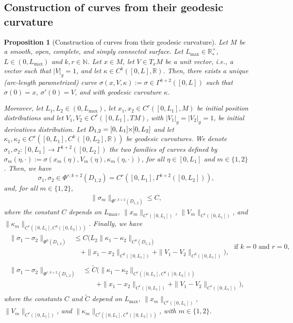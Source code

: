 \documentclass{article}
\newcommand{\Lmax}{L_{\max}}
\newcommand{\PLH}{{\mkern-1mu\times\mkern-1mu}}
\newcommand{\Times}{\PLH}
\newcommand{\R}{\mathbb{R}}
\newcommand{\surf}{M}
\newcommand{\EN}{\mathbb{N}}
\newcommand{\ko}{\kappa}
\newtheorem{proposition}[theorem]{Proposition}
\theoremstyle{remark}
\theoremstyle{prpart}
\begin{document}
\subsection{Construction of curves from their geodesic curvature}\label{subsec:construction}
\begin{proposition}[Construction of curves from their geodesic curvature]\label{prop:constr-courbe}
 Let $\surf$ be a smooth, open, complete, and simply connected surface. Let $\Lmax\in\R^+_\ast$, $L\in(0,\Lmax)$ and $k,r\in\EN$. Let $x\in \surf$, let $V\in T_x\surf$ be a unit vector, i.e., a vector such that $|V|_g=1$, and let $\ko\in C^k([0,L],\R)$. Then, there exists a unique (arc-length parametrized) curve $\sigma(x,V,\ko):=\sigma\in \Gamma^{k+2}([0,L])$ such that $\sigma(0) = x$, $\sigma'(0) = V$, and with geodesic curvature $\ko$.

  Moreover, let $L_1,L_2\in(0,\Lmax)$, let $x_1,x_2\in C^r([0,L_1],\surf)$ be initial position distributions and let $V_1,V_2\in C^r([0,L_1],T\surf)$, with $|V_1|_g=|V_2|_g=1$, be initial derivatives distribution. Let $D_{1,2}=[0,L_1]\Times[0,L_2]$ and let $\ko_1, \ko_2 \in C^r([0,L_1],C^k([0,L_2],\R))$ be geodesic curvatures. We denote $\sigma_1,\sigma_2:[0,L_1]\to \Gamma^{k+2}([0,L_2])$ the two families of curves defined by $\sigma_m(\eta,\cdot):=\sigma(x_m(\eta),V_m(\eta),\ko_m(\eta,\cdot))$, for all $\eta\in[0,L_1]$ and $m\in\{1,2\}$. Then, we have
\begin{equation*}
\sigma_1,\sigma_2\in \Phi^{r,k+2}(D_{1,2})=C^r([0,L_1],\Gamma^{k+2}([0,L_2])),
\end{equation*}
and, for all $m\in\{1,2\}$, 
\begin{equation}\label{eq:borne-courbe}
\begin{split}
\|\sigma_m\|_{\Phi^{r,k+2}(D_{1,2})} \leq C,
\end{split}
\end{equation}
where the constant $C$ depends on $\Lmax$, $\|x_m\|_{C^r([0,L_1])}$, $\|V_m\|_{C^r([0,L_1])}$, and $\|\ko_m\|_{C^r([0,L_1],C^k([0,L_2]))}$.
Finally, we have%
\begin{subequations}  \label{eq:estim-courbe}
\begin{align}\label{eq:estim-courbe1}
\begin{split}
  \|\sigma_1-\sigma_2\|_{\Phi^{0}(D_{1,2})} &\leq C\Big(L_2\|\ko_1-\ko_2\|_{C^0(D_{1,2})} \\
&  \quad+ \|x_1-x_2\|_{C^0([0,L_1])}+\|V_1-V_2\|_{C^0([0,L_1])}\Big),
\end{split}\text{ if $k=0$ and $r=0$,}\\\label{eq:estim-courbe2}
\begin{split}
  \|\sigma_1-\sigma_2\| _{\Phi^{r,k+2}(D_{1,2})}& \leq \tilde C\Big(\|\ko_1-\ko_2\|_{C^r([0,L_1],C^k([0,L_2]))} \\
  &\qquad+ \|x_1-x_2\|_{C^r([0,L_1])}+\|V_1-V_2\|_{C^r([0,L_1])}\Big),
\end{split}
\end{align}
\end{subequations}
where the constants $C$ and $\tilde C$ depend on $\Lmax$, $\|x_m\|_{C^r([0,L_1])}$, $\|V_m\|_{C^r([0,L_1])}$, and $\|\ko_m\|_{C^r([0,L_1],C^k([0,L_2]))}$, with $m\in\{1,2\}$.
\end{proposition}
\end{document}
